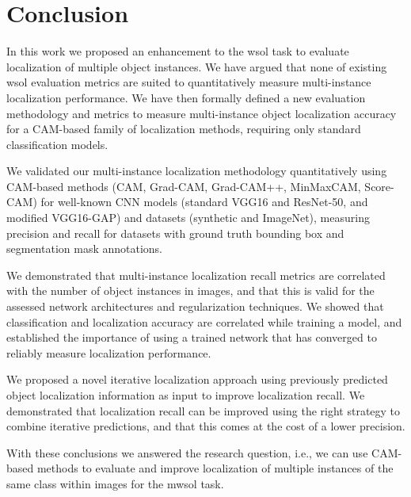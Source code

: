\chapter{Conclusion} \label{ch:conclusion}

In this work we proposed an enhancement to the \acrlong{wsol} task to evaluate localization of multiple object instances. We have argued that none of existing \acrshort{wsol} evaluation metrics are suited to quantitatively measure multi-instance localization performance. We have then formally defined a new evaluation methodology and metrics to measure multi-instance object localization accuracy for a CAM-based family of localization methods, requiring only standard classification models.

We validated our multi-instance localization methodology quantitatively using CAM-based methods (CAM, Grad-CAM, Grad-CAM++, MinMaxCAM, Score-CAM) for well-known CNN models (standard VGG16 and ResNet-50, and modified VGG16-GAP) and datasets (synthetic and ImageNet), measuring precision and recall for datasets with ground truth bounding box and segmentation mask annotations.

We demonstrated that multi-instance localization recall metrics are correlated with the number of object instances in images, and that this is valid for the assessed network architectures and regularization techniques. We showed that classification and localization accuracy are correlated while training a model, and established the importance of using a trained network that has converged to reliably measure localization performance.

We proposed a novel iterative localization approach using previously predicted object localization information as input to improve localization recall. We demonstrated that localization recall can be improved using the right strategy to combine iterative predictions, and that this comes at the cost of a lower precision.

With these conclusions we answered the research question, i.e., we can use CAM-based methods to evaluate and improve localization of multiple instances of the same class within images for the \acrshort{mwsol} task.